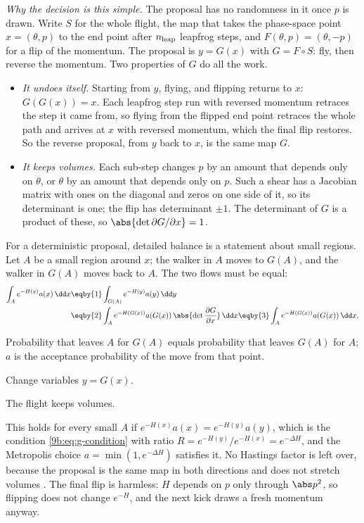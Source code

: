 \emph{Why the decision is this simple.} The proposal has no randomness in it once $p$ is drawn.
Write $S$ for the whole flight, the map that takes the phase-space point $x=(\theta,p)$ to the end
point after $n_{\rm leap}$ leapfrog steps, and $F(\theta,p)=(\theta,-p)$ for a flip of the
momentum. The proposal is $y=G(x)$ with $G=F\circ S$: fly, then reverse the momentum. Two
properties of $G$ do all the work.
\begin{itemize}[itemsep=1pt]
  \item \emph{It undoes itself.} Starting from $y$, flying, and flipping returns to $x$:
        $G(G(x))=x$. Each leapfrog step run with reversed momentum retraces the step it came from,
        so flying from the flipped end point retraces the whole path and arrives at $x$ with
        reversed momentum, which the final flip restores. So the reverse proposal, from $y$ back to
        $x$, is the same map $G$.
  \item \emph{It keeps volumes.} Each sub-step changes $p$ by an amount that depends only on
        $\theta$, or $\theta$ by an amount that depends only on $p$. Such a shear has a Jacobian
        matrix with ones on the diagonal and zeros on one side of it, so its determinant is one;
        the flip has determinant $\pm1$. The determinant of $G$ is a product of these, so
        $\abs{\det\partial G/\partial x}=1$.
\end{itemize}
For a deterministic proposal, detailed balance is a statement about small regions. Let $A$ be a
small region around $x$; the walker in $A$ moves to $G(A)$, and the walker in $G(A)$ moves back to
$A$. The two flows must be equal:
\begin{align*}
  \int_A e^{-H(x)}a(x)\,\dd x
  &\eqby{1}\int_{G(A)}e^{-H(y)}a(y)\,\dd y
  \\
  &\eqby{2}\int_A e^{-H(G(x))}a(G(x))\,\abs{\det\frac{\partial G}{\partial x}}\,\dd x
   \eqby{3}\int_A e^{-H(G(x))}a(G(x))\,\dd x ,
\end{align*}
\begin{explain}
  \item Probability that leaves $A$ for $G(A)$ equals probability that leaves $G(A)$ for $A$; $a$
        is the acceptance probability of the move from that point.
  \item Change variables $y=G(x)$.
  \item The flight keeps volumes.
\end{explain}
This holds for every small $A$ if $e^{-H(x)}a(x)=e^{-H(y)}a(y)$, which is the condition
\eqref{9b:eq:g-condition} with ratio $R=e^{-H(y)}/e^{-H(x)}=e^{-\Delta H}$, and the Metropolis
choice $a=\min(1,e^{-\Delta H})$ satisfies it. No Hastings factor is left over, because the
proposal is the same map in both directions and does not stretch volumes \parencite{Neal2011}.
The final flip is harmless: $H$ depends on $p$ only through $\abs p^2$, so flipping does not
change $e^{-H}$, and the next kick draws a fresh momentum anyway.

